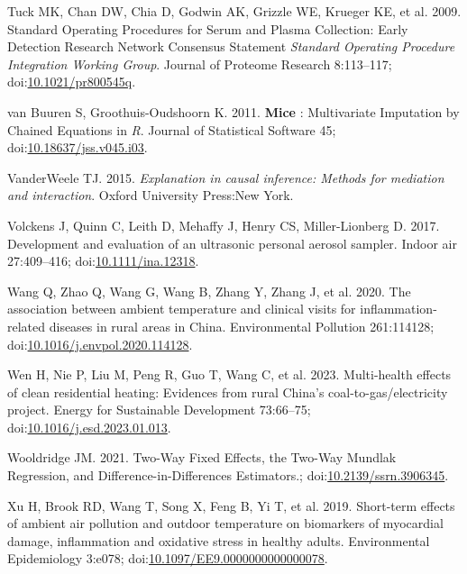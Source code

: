 \documentclass[
  letterpaper,
  DIV=11,
  numbers=noendperiod]{scrartcl}
\newlength{\cslhangindent}
\newlength{\cslentryspacingunit} %
\newenvironment{CSLReferences}[2] %
 {%
  \setlength{\parindent}{0pt}
  \ifodd #1
  \let\oldpar\par
  \def\par{\hangindent=\cslhangindent\oldpar}
  \fi
  \setlength{\parskip}{#2\cslentryspacingunit}
 }%
 {}
\begin{document}
\begin{CSLReferences}{1}{0}
\leavevmode{}%
Tuck MK, Chan DW, Chia D, Godwin AK, Grizzle WE, Krueger KE, et al.
2009. Standard {Operating Procedures} for {Serum} and {Plasma
Collection}: {Early Detection Research Network Consensus Statement}
{\emph{Standard Operating Procedure Integration Working Group}}. Journal
of Proteome Research 8:113--117;
doi:\href{https://doi.org/10.1021/pr800545q}{10.1021/pr800545q}.

\leavevmode{}%
van Buuren S, Groothuis-Oudshoorn K. 2011. {\textbf{Mice}} :
{Multivariate Imputation} by {Chained Equations} in {\emph{R}}. Journal
of Statistical Software 45;
doi:\href{https://doi.org/10.18637/jss.v045.i03}{10.18637/jss.v045.i03}.

\leavevmode{}%
VanderWeele TJ. 2015. \emph{Explanation in causal inference: Methods for
mediation and interaction}. Oxford University Press:New York.

\leavevmode{}%
Volckens J, Quinn C, Leith D, Mehaffy J, Henry CS, Miller-Lionberg D.
2017. Development and evaluation of an ultrasonic personal aerosol
sampler. Indoor air 27:409--416;
doi:\href{https://doi.org/10.1111/ina.12318}{10.1111/ina.12318}.

\leavevmode{}%
Wang Q, Zhao Q, Wang G, Wang B, Zhang Y, Zhang J, et al. 2020. The
association between ambient temperature and clinical visits for
inflammation-related diseases in rural areas in {China}. Environmental
Pollution 261:114128;
doi:\href{https://doi.org/10.1016/j.envpol.2020.114128}{10.1016/j.envpol.2020.114128}.

\leavevmode{}%
Wen H, Nie P, Liu M, Peng R, Guo T, Wang C, et al. 2023. Multi-health
effects of clean residential heating: {Evidences} from rural {China}'s
coal-to-gas/electricity project. Energy for Sustainable Development
73:66--75;
doi:\href{https://doi.org/10.1016/j.esd.2023.01.013}{10.1016/j.esd.2023.01.013}.

\leavevmode{}%
Wooldridge JM. 2021. Two-{Way Fixed Effects}, the {Two-Way Mundlak
Regression}, and {Difference-in-Differences Estimators}.;
doi:\href{https://doi.org/10.2139/ssrn.3906345}{10.2139/ssrn.3906345}.

\leavevmode{}%
Xu H, Brook RD, Wang T, Song X, Feng B, Yi T, et al. 2019. Short-term
effects of ambient air pollution and outdoor temperature on biomarkers
of myocardial damage, inflammation and oxidative stress in healthy
adults. Environmental Epidemiology 3:e078;
doi:\href{https://doi.org/10.1097/EE9.0000000000000078}{10.1097/EE9.0000000000000078}.


\end{CSLReferences}
\end{document}
